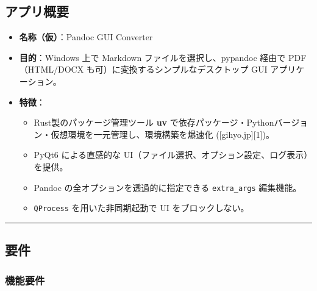 \subsection{アプリ概要}\label{ux30a2ux30d7ux30eaux6982ux8981}

\begin{itemize}
\item
  \textbf{名称（仮）}：Pandoc GUI Converter
\item
  \textbf{目的}：Windows 上で Markdown ファイルを選択し、pypandoc 経由で PDF（HTML/DOCX も可）に変換するシンプルなデスクトップ GUI アプリケーション。
\item
  \textbf{特徴}：

  \begin{itemize}
  \tightlist
  \item
    Rust製のパッケージ管理ツール \textbf{uv} で依存パッケージ・Pythonバージョン・仮想環境を一元管理し、環境構築を爆速化 ({[}gihyo.jp{]}{[}1{]})。
  \item
    PyQt6 による直感的な UI（ファイル選択、オプション設定、ログ表示）を提供。
  \item
    Pandoc の全オプションを透過的に指定できる \texttt{extra\_args} 編集機能。
  \item
    \texttt{QProcess} を用いた非同期起動で UI をブロックしない。
  \end{itemize}
\end{itemize}

\begin{center}\rule{0.5\linewidth}{0.5pt}\end{center}

\subsection{要件}\label{ux8981ux4ef6}

\subsubsection{機能要件}\label{ux6a5fux80fdux8981ux4ef6}

